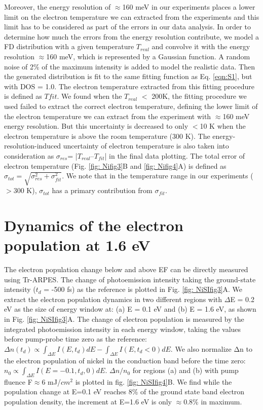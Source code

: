 Moreover, the energy resolution of $\approx$160 meV in our experiments places a lower limit on the electron temperature we can extracted from the experiments and this limit has to be considered as part of the errors in our data analysis. In order to determine how much the errors from the energy resolution contribute, we model a FD distribution with a given temperature $T_{real}$ and convolve it with the energy resolution $\approx$160 meV, which is represented by a Gaussian function. A random noise of 2\% of the maximum intensity is added to model the realistic data. Then the generated distribution is fit to the same fitting function as Eq. \ref{eqn:S1}, but with DOS = 1.0. The electron temperature extracted from this fitting procedure is defined as $T{fit}$. We found when the $T_{real}$ $<$ 200K, the fitting procedure we used failed to extract the correct electron temperature, defining the lower limit of the electron temperature we can extract from the experiment with $\approx$160 meV energy resolution. But this uncertainty is decreased to only $<$10 K when the electron temperature is above the room temperature (300 K). The energy-resolution-induced uncertainty of electron temperature is also taken into consideration as $\sigma_{res}$= |$T_{real} – T_{fit}$| in the final data plotting. The total error of electron temperature (Fig. \ref{fig: Nifig3}B and \ref{fig: Nifig4}A) is defined as $\sigma_{tot}=\sqrt{\sigma_{res}^2+\sigma_{fit}^2}$. We note that in the temperature range in our experiments ($>$300 K), $\sigma_{tot}$ has a primary contribution from $\sigma_{fit}$.

\section{Dynamics of the electron population at 1.6 eV}
The electron population change below and above EF can be directly measured using Tr-ARPES. The change of photoemission intensity taking the ground-state intensity ($t_{d}$ = -500 fs) as the reference is plotted in Fig. \ref{fig: NiSIfig3}A. We extract the electron population dynamics in two different regions with $\Delta$E = 0.2 eV as the size of energy window at: (a) E = 0.1 eV and (b) E = 1.6 eV, as shown in Fig. \ref{fig: NiSIfig3}A. The change of electron population is measured by the integrated photoemission intensity in each energy window, taking the values before pump-probe time zero as the reference:$\Delta n(t_d)\propto\int_{\Delta E}I(E,t_d)dE-\int_{\Delta E}I(E,t_d<0)dE$. We also normalize Δn to the electron population of nickel in the conduction band before the time zero: $n_0\propto \int_{\Delta E} I(E=-0.1,t_d,0)dE$. $\Delta n/n_0$ for regions (a) and (b) with pump fluence F$\approx$6 mJ/$cm^2$ is plotted in fig. \ref{fig: NiSIfig4}B. We find while the population change at E=0.1 eV reaches 8\% of the ground state band electron population density, the increment at E=1.6 eV is only $\approx$0.8\% in maximum.

